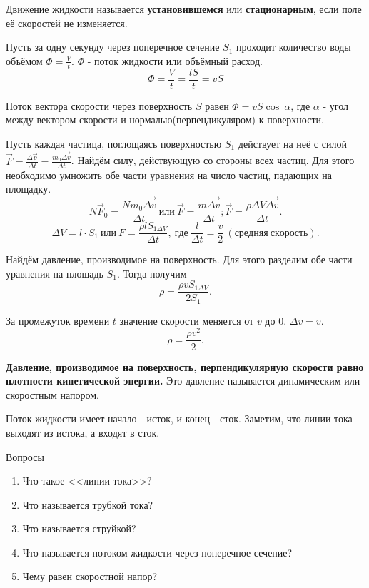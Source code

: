 \documentclass[a6paper, 11pt]{diss_4}
\renewcommand{\'}{\,'}
\begin{document}
  Движение жидкости называется \textbf{установившемся} или
\textbf{стационарным}, если поле её скоростей не изменяется.

  Пусть за одну секунду через поперечное сечение $S_1$ проходит количество
воды объёмом $\Phi=\frac{V}{t}$. $\Phi$ - поток жидкости или объёмный расход.
\[
\Phi=\frac{V}{t}=\frac{lS}{t}=vS
\]

  Поток вектора скорости через поверхность $S$ равен $\Phi=vS\cos\ \alpha$, где
 $\alpha$ - угол между вектором скорости и нормалью(перпендикуляром) к
поверхности.

  Пусть каждая частица, поглощаясь поверхностью $S_1$ действует на неё с силой
 $\vec{F}=\frac{\Delta\vec{p}}{\Delta t}=\frac{m_0\vec{\Delta v}}{\Delta t}$.
Найдём силу, действующую со стороны всех частиц. Для этого необходимо
умножить обе части уравнения на число частиц, падающих на площадку.
\[
N\vec{F}_0=\frac{Nm_0\vec{\Delta v}}{\Delta t}\ или \
\vec{F}=\frac{m\vec{\Delta v}}{\Delta t};
\vec{F}=\frac{\rho\Delta V\vec{\Delta v}}{\Delta t}.
\]
\[
\Delta V=l\cdot S_1\ или \
F=\frac{\rho l S_{1\Delta V}}{\Delta t},\ где\
\frac{l}{\Delta t}=\frac{v}{2}\ (средняя\ скорость).
\]

  Найдём давление, производимое на поверхность. Для этого разделим обе части
уравнения на площадь $S_1$. Тогда получим
\[
\rho=\frac{\rho v S_{1\Delta V}}{2S_1}.
\]

  За промежуток времени $t$ значение скорости меняется от $v$ до $0$. $\Delta
v= v$.
\[
\rho=\frac{\rho v^2}{2}.
\]

  \textbf{Давление, производимое на поверхность, перпендикулярную скорости равно
плотности кинетической энергии.} Это давление называется динамическим или
скоростным напором.

  Поток жидкости имеет начало - исток, и конец - сток. Заметим, что линии тока
выходят из истока, а входят в сток.

\begin{center}
   Вопросы
\end{center}
\begin{enumerate}
\item Что такое <<линии тока>>?
\item Что называется трубкой тока?
\item Что называется струйкой?
\item Что называется потоком жидкости через поперечное сечение?
\item Чему равен скоростной напор?
\end{enumerate}
\end{document}
